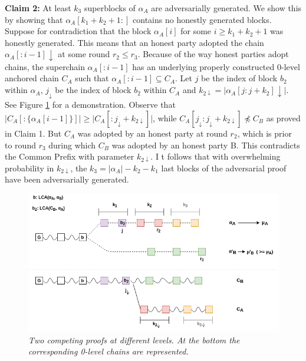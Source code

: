 \textbf{Claim 2:} At least $k_3$ superblocks of $\alpha_A$ are adversarially generated.
We show this by showing that $\alpha_A[k_1 + k_2 + 1:]$ contains no honestly generated
blocks. Suppose for contradiction that the block $\alpha_A[i]$ for some $i \geq k_1 +
k_2 + 1$ was honestly generated. This means that an honest party adopted the chain
$\alpha_A[:i - 1]\downarrow$ at some round $r_2 \leq r_3$. Because of the way honest
parties adopt chains, the superchain $\alpha_A[:i - 1]$ has an underlying properly
constructed 0-level anchored chain $C_A$ such that $\alpha_A[:i - 1] \subseteq C_A$.
Let $j$ be the index of block $b_2$ within $\alpha_A$, $j_\downarrow$ be the index
of block $b_2$ within $C_A$ and $k_{2\downarrow} = \vert \alpha_A[j:j+k_2]\downarrow\vert$.
See Figure \ref{fig:proof} for a demonstration. Observe that $\vert C_A[:\{\alpha_A[i-1]\}]
\vert \geq \vert C_A[:{j_\downarrow}+k_{2\downarrow}] \vert$, while
$C_A[j_\downarrow:j_\downarrow + k_{2\downarrow}] \npreceq C_B$ as proved in
Claim 1. But $C_A$ was adopted by an honest party at round $r_2$, which is prior
to round $r_3$ during which $C_B$ was adopted by an honest party B. This 
contradicts the Common Prefix\cite{Backbone} with parameter $k_{2\downarrow}$. I
t follows that with overwhelming probability in $k_{2\downarrow}$, the $k_3 =
\vert \alpha_A \vert - k_2 - k_1$ last blocks of the adversarial proof have
been adversarially generated.\\

\begin{figure}[h]
	\begin{center}
		\includegraphics[scale=0.5]{figures/proof.png}
	\end{center}
	\caption{\textit{Two competing proofs at different levels. At the bottom the
	corresponding 0-level chains are represented.}}
	\label{fig:proof}
\end{figure}

